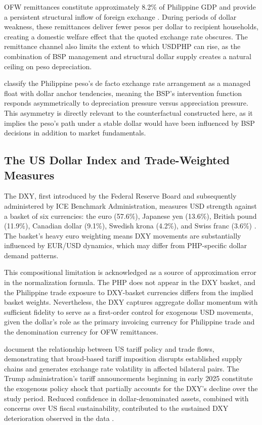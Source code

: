 \documentclass[12pt]{article}
\begin{document}
OFW remittances constitute approximately 8.2\% of Philippine GDP and provide a
persistent structural inflow of foreign exchange \citep{worldbank2023}. During periods
of dollar weakness, these remittances deliver fewer pesos per dollar to recipient
households, creating a domestic welfare effect that the quoted exchange rate obscures.
The remittance channel also limits the extent to which USDPHP can rise, as the
combination of BSP management and structural dollar supply creates a natural ceiling on
peso depreciation.

\citet{ilzetzki2019} classify the Philippine peso's de facto exchange rate arrangement
as a managed float with dollar anchor tendencies, meaning the BSP's intervention
function responds asymmetrically to depreciation pressure versus appreciation pressure.
This asymmetry is directly relevant to the counterfactual constructed here, as it
implies the peso's path under a stable dollar would have been influenced by BSP
decisions in addition to market fundamentals.

\subsection{The US Dollar Index and Trade-Weighted Measures}

The DXY, first introduced by the Federal Reserve Board and subsequently administered
by ICE Benchmark Administration, measures USD strength against a basket of six
currencies: the euro (57.6\%), Japanese yen (13.6\%), British pound (11.9\%), Canadian
dollar (9.1\%), Swedish krona (4.2\%), and Swiss franc (3.6\%) \citep{ice2023}. The
basket's heavy euro weighting means DXY movements are substantially influenced by
EUR/USD dynamics, which may differ from PHP-specific dollar demand patterns.

This compositional limitation is acknowledged as a source of approximation error in
the normalization formula. The PHP does not appear in the DXY basket, and the
Philippine trade exposure to DXY-basket currencies differs from the implied basket
weights. Nevertheless, the DXY captures aggregate dollar momentum with sufficient
fidelity to serve as a first-order control for exogenous USD movements, given the
dollar's role as the primary invoicing currency for Philippine trade and the
denomination currency for OFW remittances.

\citet{fajgelbaum2022} document the relationship between US tariff policy and trade
flows, demonstrating that broad-based tariff imposition disrupts established supply
chains and generates exchange rate volatility in affected bilateral pairs. The Trump
administration's tariff announcements beginning in early 2025 constitute the
exogenous policy shock that partially accounts for the DXY's decline over the study
period. Reduced confidence in dollar-denominated assets, combined with concerns over
US fiscal sustainability, contributed to the sustained DXY deterioration observed
in the data \citep{imf2025}.
\end{document}
